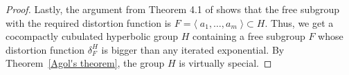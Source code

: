 \documentclass[oneside,11pt,reqno]{amsart}
\theoremstyle{definition}
\begin{document}
\begin{proof}

Lastly, the argument from Theorem 4.1 of \cite{BBD} shows that the free subgroup with the required distortion function is $F= \langle \;a_1, \ldots, a_m \; \rangle \subset H$. Thus, we get a cocompactly cubulated hyperbolic group $H$ containing a free subgroup $F$ whose distortion function $\delta_F^H$ is bigger than any iterated exponential. By Theorem~\ref{Agol's theorem}, the group $H$ is virtually special.

\end{proof}
\end{document}
